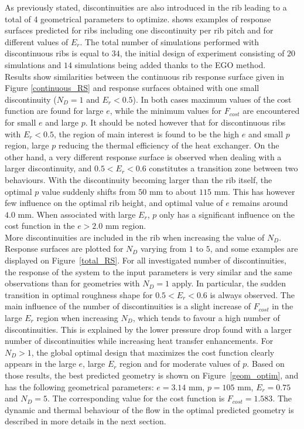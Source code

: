 As previously stated, discontinuities are also introduced in the rib leading to a total of 4 geometrical parameters to optimize.  shows examples of response surfaces predicted for ribs including one discontinuity per rib pitch and for different values of $E_r$. The total number of simulations performed with discontinuous ribs is equal to $34$, the initial design of experiment consisting of $20$ simulations and $14$ simulations being added thanks to the EGO method.\\

Results show similarities between the continuous rib response surface given in Figure \ref{continuous_RS} and response surfaces obtained with one small discontinuity ($N_D=1$ and $E_r < 0.5$). In both cases maximum values of the cost function are found for large $e$, while the minimum values for $F_{cost}$ are encountered for small $e$ and large $p$. It should be noted however that for discontinuous ribs with $E_r < 0.5$, the region of main interest is found to be the high $e$ and small $p$ region, large $p$ reducing the thermal efficiency of the heat exchanger. On the other hand, a very different response surface is observed when dealing with a larger discontinuity, and $0.5 < E_r < 0.6$ constitutes a transition zone between two behaviours. With the discontinuity becoming larger than the rib itself, the optimal $p$ value suddenly shifts from $50$ mm to about $115$ mm. This has however few influence on the optimal rib height, and optimal value of $e$ remains around $4.0$ mm. When associated with large $E_r$, $p$ only has a significant influence on the cost function in the $e > 2.0$ mm region.\\

More discontinuities are included in the rib when increasing the value of $N_D$. Response surfaces are plotted for $N_D$ varying from $1$ to $5$, and some examples are displayed on Figure~\ref{total_RS}. For all investigated number of discontinuities, the response of the system to the input parameters is very similar and the same observations than for geometries with $N_D=1$ apply. In particular, the sudden transition in optimal roughness shape for $0.5 < E_r < 0.6$ is always observed. The main influence of the number of discontinuities is a slight increase of $F_{cost}$ in the large $E_r$ region when increasing $N_D$, which tends to favour a high number of discontinuities. This is explained by the lower pressure drop found with a larger number of discontinuities while increasing heat transfer enhancements. For $N_D > 1$, the global optimal design that maximizes the cost function clearly appears in the large $e$, large $E_r$ region and for moderate values of $p$. Based on those results, the best predicted geometry is shown on Figure~\ref{geom_optim}, and has the following geometrical parameters: $e=3.14$ mm, $p=105$ mm, $E_r=0.75$ and $N_D=5$. The corresponding value for the cost function is $F_{cost}=1.583$. The dynamic and thermal behaviour of the flow in the optimal predicted geometry is described in more details in the next section.\\

